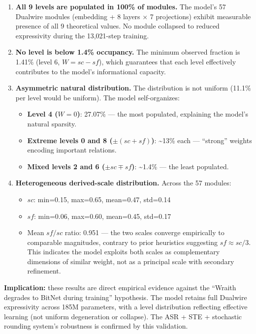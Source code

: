 \begin{enumerate}
\def\labelenumi{\arabic{enumi}.}
\item
  \textbf{All 9 levels are populated in 100\% of modules.} The model's
  57 Dualwire modules (embedding + 8 layers × 7 projections) exhibit
  measurable presence of all 9 theoretical values. No module collapsed
  to reduced expressivity during the 13,021-step training.
\item
  \textbf{No level is below 1.4\% occupancy.} The minimum observed
  fraction is 1.41\% (level 6, \(W = sc-sf\)), which guarantees that
  each level effectively contributes to the model's informational
  capacity.
\item
  \textbf{Asymmetric natural distribution.} The distribution is not
  uniform (11.1\% per level would be uniform). The model self-organizes:

  \begin{itemize}
  \tightlist
  \item
    \textbf{Level 4 (\(W=0\))}: 27.07\% --- the most populated,
    explaining the model's natural sparsity.
  \item
    \textbf{Extreme levels 0 and 8 (\(\pm(sc+sf)\))}:
    \textasciitilde13\% each --- ``strong'' weights encoding important
    relations.
  \item
    \textbf{Mixed levels 2 and 6 (\(\pm sc \mp sf\))}:
    \textasciitilde1.4\% --- the least populated.
  \end{itemize}
\item
  \textbf{Heterogeneous derived-scale distribution.} Across the 57
  modules:

  \begin{itemize}
  \tightlist
  \item
    \(sc\): min=0.15, max=0.65, mean=0.47, std=0.14
  \item
    \(sf\): min=0.06, max=0.60, mean=0.45, std=0.17
  \item
    Mean \(sf/sc\) ratio: 0.951 --- the two scales converge empirically
    to comparable magnitudes, contrary to prior heuristics suggesting
    \(sf \approx sc/3\). This indicates the model exploits both scales
    as complementary dimensions of similar weight, not as a principal
    scale with secondary refinement.
  \end{itemize}
\end{enumerate}

\textbf{Implication:} these results are direct empirical evidence
against the ``Wraith degrades to BitNet during training'' hypothesis.
The model retains full Dualwire expressivity across 185M parameters,
with a level distribution reflecting effective learning (not uniform
degeneration or collapse). The ASR + STE + stochastic rounding system's
robustness is confirmed by this validation.


